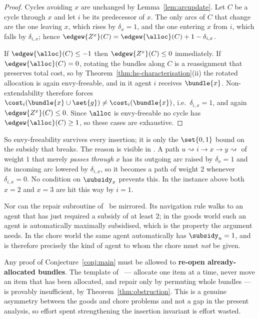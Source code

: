 \begin{proof}
Cycles avoiding $x$ are unchanged by Lemma~\ref{lem:arcupdate}. Let $C$ be a
cycle through $x$ and let $i$ be its predecessor of $x$. The only arcs of $C$
that change are the one leaving $x$, which rises by $\delta_x = 1$, and the one
entering $x$ from $i$, which falls by $\delta_{i,x}$; hence
$\edgew{Z^x}(C) = \edgew{\alloc}(C) + 1 - \delta_{i,x}$.

If $\edgew{\alloc}(C) \le -1$ then $\edgew{Z^x}(C) \le 0$ immediately. If
$\edgew{\alloc}(C) = 0$, rotating the bundles along $C$ is a reassignment that
preserves total cost, so by Theorem~\ref{thm:hs-characterisation}(ii) the
rotated allocation is again envy-freeable, and in it agent $i$ receives
$\bundle{x}$. Non-extendability therefore forces $\cost_i(\bundle{x} \cup
\set{g}) \ne \cost_i(\bundle{x})$, i.e.\ $\delta_{i,x} = 1$, and again
$\edgew{Z^x}(C) \le 0$. Since $\alloc$ is envy-freeable no cycle has
$\edgew{\alloc}(C) \ge 1$, so these cases are exhaustive.
\end{proof}

So envy-freeability survives every insertion; it is only the $\set{0,1}$ bound
on the subsidy that breaks. The reason is visible in . A
path $u \rightsquigarrow i \to x \to y \rightsquigarrow$ of weight $1$ that
merely \emph{passes through} $x$ has its outgoing arc raised by $\delta_x = 1$
and its incoming arc lowered by $\delta_{i,x}$, so it becomes a path of weight
$2$ whenever $\delta_{i,x} = 0$. No condition on $\subsidy_x$ prevents this. In
the instance above both $x = 2$ and $x = 3$ are hit this way by $i = 1$.

Nor can the repair subroutine of~\cite{BKNS22} be mirrored. Its navigation rule
walks to an agent that has just required a subsidy of at least $2$; in the goods
world such an agent is automatically maximally subsidised, which is the property
the argument needs. In the chore world the same agent automatically has
$\subsidy_u = 1$, and is therefore precisely the kind of agent to whom the chore
must \emph{not} be given.

\begin{remark}
\label{rem:deadend}
Any proof of Conjecture~\ref{conj:main} must be allowed to \textbf{re-open
already-allocated bundles}. The template of~\cite{BKNS22} --- allocate one item
at a time, never move an item that has been allocated, and repair only by
permuting whole bundles --- is provably insufficient, by
Theorem~\ref{thm:obstruction}. This is a genuine asymmetry between the goods and
chore problems and not a gap in the present analysis, so effort spent
strengthening the insertion invariant is effort wasted.
\end{remark}
